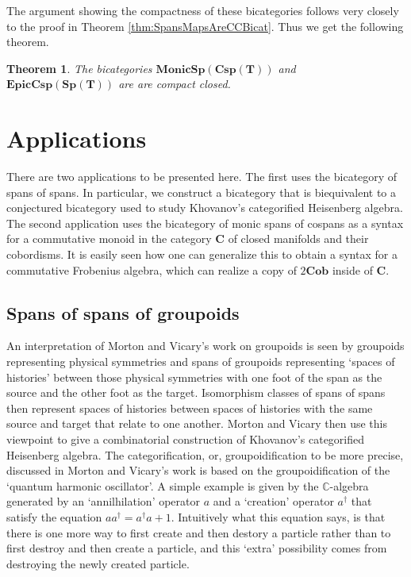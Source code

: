 \documentclass[11pt]{amsart}
\newcommand{\cat}[1]{\mathbf{#1}}
\newcommand{\bimonspcsp}[1]{\mathbf{MonicSp(Csp(#1))}}
\newcommand{\biepiccspsp}[1]{\mathbf{EpicCsp(Sp(#1))}}
\newtheorem{thm}{Theorem}[section]
\theoremstyle{remark}
\theoremstyle{definition}
\begin{document}
The argument showing the compactness of these bicategories follows very closely to the proof in Theorem \ref{thm:SpansMapsAreCCBicat}. Thus we get the following theorem.

\begin{thm}
	\label{thm:SpansCospansAreCCBicat}
	The bicategories $\bimonspcsp{T}$ and $\biepiccspsp{T}$ are are compact closed.
\end{thm}

\section{Applications} %
\label{sec:Applications}

There are two applications to be presented here.  The first uses the bicategory of spans of spans.  In particular, we construct a bicategory that is biequivalent to a conjectured bicategory used to study Khovanov's categorified Heisenberg algebra.  The second application uses the bicategory of monic spans of cospans as a syntax for a commutative monoid in the category $\cat{C}$ of closed manifolds and their cobordisms. It is easily seen how one can generalize this to obtain a syntax for a commutative Frobenius algebra, which can realize a copy of $2\cat{Cob}$ inside of $\cat{C}$.   


\subsection{Spans of spans of groupoids} %
\label{subsec:SpanSpanGroupoid}


An interpretation of Morton and Vicary's \cite{MortVic} work on groupoids is seen by groupoids representing physical symmetries and spans of groupoids representing `spaces of histories' between those physical symmetries with one foot of the span as the source and the other foot as the target. Isomorphism classes of spans of spans then represent spaces of histories between spaces of histories with the same source and target that relate to one another. Morton and Vicary then use this viewpoint to give a combinatorial construction of Khovanov's categorified Heisenberg algebra. The categorification, or, groupoidification to be more precise, discussed in Morton and Vicary's work is based on the groupoidification of the `quantum harmonic oscillator'. A simple example is given by the $\mathbb{C}$-algebra generated by an `annilhilation' operator $a$ and a `creation' operator $a^\dagger$ that satisfy the equation $aa^\dagger=a^\dagger a+1$. Intuitively what this equation says, is that there is one more way to first create and then destory a particle rather than to first destroy and then create a particle, and this `extra' possibility comes from destroying the newly created particle.
\end{document}

